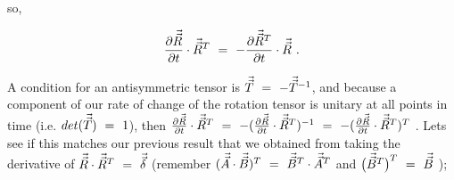 \documentclass{article}
\begin{document}
so,

\begin{equation} \label{eb-eq-1-56}
\frac{\partial{\vec{\vec{R}}}}{\partial{t}} \cdot  \vec{\vec{R}}^{T} \hspace{0.125cm} = \hspace{0.125cm} - \frac{\partial{\vec{\vec{R}}^{T}}}{\partial{t}} \cdot  \vec{\vec{R}}\hspace{0.125cm} . 
\end{equation}

A condition for an antisymmetric tensor is  \begin{math} \vec{\vec{T}}  \hspace{0.125cm} = \hspace{0.125cm} - \vec{\vec{T}}^{-1} \end{math}, and because a component of our rate of change of the rotation tensor is unitary at all points in time (i.e. \begin{math} det (\vec{\vec{T}} ) \hspace{0.125cm} = \hspace{0.125cm} 1 \end{math}), then \begin{math} \frac{\partial{\vec{\vec{R}}}}{\partial{t}} \cdot  \vec{\vec{R}}^{T} \hspace{0.125cm} = \hspace{0.125cm} - ( \frac{\partial{\vec{\vec{R}}}}{\partial{t}} \cdot  \vec{\vec{R}}^{T} )^{-1} \hspace{0.125cm} = \hspace{0.125cm} - ( \frac{\partial{\vec{\vec{R}}}}{\partial{t}} \cdot  \vec{\vec{R}}^{T} )^{T}  \end{math} . Lets see if this matches our previous result that we obtained from taking the derivative of \begin{math} \vec{\vec{R}} \cdot \vec{\vec{R}}^{T} \hspace{0.125cm} = \hspace{0.125cm} \vec{\vec{\delta}} \end{math} (remember \begin{math} ( \vec{\vec{A}} \cdot \vec{\vec{B}} )^{T} \hspace{0.125cm} = \hspace{0.125cm} \vec{\vec{B}}^{T} \cdot \vec{\vec{A}}^T \end{math} and \begin{math} \big( \vec{\vec{B}}^{T} \big)^{T} \hspace{0.125cm} = \hspace{0.125cm} \vec{\vec{B}} \end{math}  );
\end{document}

